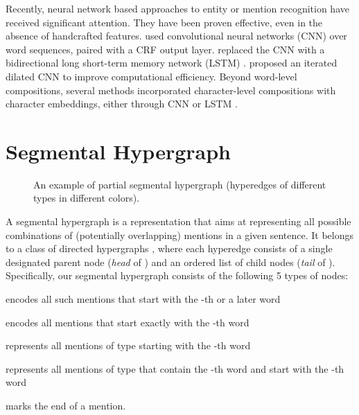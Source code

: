 \documentclass[11pt,a4paper]{article}
\theoremstyle{theorem}
\newcounter{Lcount}
\newcommand{\squishlist}{
\begin{list}{}
{ \usecounter{Lcount}
\setlength{\itemsep}{0pt}
\setlength{\parsep}{0pt}
\setlength{\topsep}{0pt}
\setlength{\partopsep}{0pt}
\setlength{\leftmargin}{2em}
\setlength{\labelwidth}{1.5em}
\setlength{\labelsep}{0.5em} } }
\newcommand{\squishend}{
\end{list} }
\begin{document}
Recently, neural network based approaches to entity or mention recognition have received significant attention.
They have been proven effective, even in the absence of handcrafted features.
\citet{collobert2011natural} used convolutional neural networks (CNN) over word sequences, {\color{black} paired with a CRF output layer}.
\citet{huang2015bidirectional} replaced the CNN with a bidirectional long short-term memory network (LSTM) \cite{hochreiter1997long}.
\citet{strubell2017fast} proposed an iterated dilated CNN to improve computational efficiency.
Beyond word-level compositions, several methods incorporated character-level compositions with character embeddings, 
either through CNN \cite{chiu2016named,ma-hovy:2016:P16-1} or LSTM \cite{lample2016neural}.




\section{Segmental Hypergraph}




\begin{figure}[t!]
\small
\begin{center}
\scalebox{0.86}
{
}
\caption{
An example of partial segmental hypergraph (hyperedges of different types in different colors).
}
\label{fig:arch}
\end{center}
\end{figure}




A segmental hypergraph is a representation that aims at representing all possible combinations of (potentially overlapping) mentions in a given sentence.
It belongs to a  class of directed hypergraphs \cite{gallo1993directed}, where each hyperedge  consists of a single designated parent node ({\em head} of ) and an ordered list of child nodes ({\em tail} of ). 
Specifically, our segmental hypergraph consists of the following 5 types of nodes:
\squishlist
\item  encodes all such mentions that start with the -th or a later word
\item  encodes all  mentions that start exactly with the -th word
\item  represents all mentions of type  starting with the -{th} word
\item  represents all mentions of type  that contain the -th word and start with the -th word
\item  marks the end of a mention.
\squishend
\end{document}
